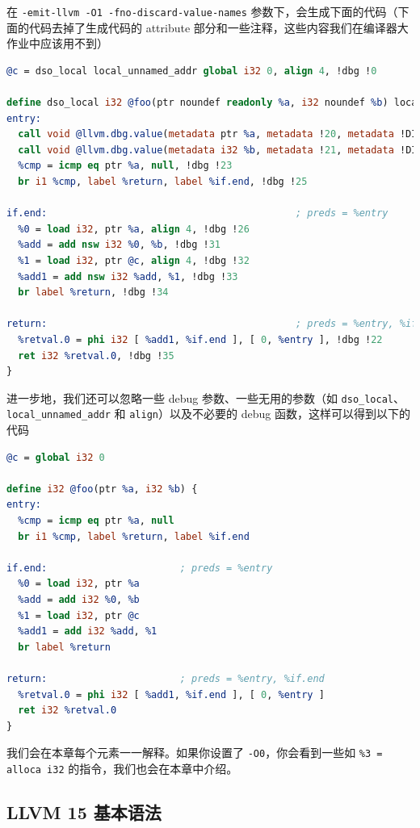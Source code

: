 在 \texttt{-emit-llvm -O1 -fno-discard-value-names}
参数下，会生成下面的代码（下面的代码去掉了生成代码的 attribute
部分和一些注释，这些内容我们在编译器大作业中应该用不到）

\begin{lstlisting}[language=llvm]
@c = dso_local local_unnamed_addr global i32 0, align 4, !dbg !0

define dso_local i32 @foo(ptr noundef readonly %a, i32 noundef %b) local_unnamed_addr #0 !dbg !15 {
entry:
  call void @llvm.dbg.value(metadata ptr %a, metadata !20, metadata !DIExpression()), !dbg !22
  call void @llvm.dbg.value(metadata i32 %b, metadata !21, metadata !DIExpression()), !dbg !22
  %cmp = icmp eq ptr %a, null, !dbg !23
  br i1 %cmp, label %return, label %if.end, !dbg !25

if.end:                                           ; preds = %entry
  %0 = load i32, ptr %a, align 4, !dbg !26
  %add = add nsw i32 %0, %b, !dbg !31
  %1 = load i32, ptr @c, align 4, !dbg !32
  %add1 = add nsw i32 %add, %1, !dbg !33
  br label %return, !dbg !34

return:                                           ; preds = %entry, %if.end
  %retval.0 = phi i32 [ %add1, %if.end ], [ 0, %entry ], !dbg !22
  ret i32 %retval.0, !dbg !35
}
\end{lstlisting}

进一步地，我们还可以忽略一些 debug 参数、一些无用的参数（如
\texttt{dso\_local}、\texttt{local\_unnamed\_addr} 和
\texttt{align}）以及不必要的 debug 函数，这样可以得到以下的代码

\begin{lstlisting}[language=llvm]
@c = global i32 0

define i32 @foo(ptr %a, i32 %b) {
entry:
  %cmp = icmp eq ptr %a, null
  br i1 %cmp, label %return, label %if.end

if.end:                       ; preds = %entry
  %0 = load i32, ptr %a
  %add = add i32 %0, %b
  %1 = load i32, ptr @c
  %add1 = add i32 %add, %1
  br label %return

return:                       ; preds = %entry, %if.end
  %retval.0 = phi i32 [ %add1, %if.end ], [ 0, %entry ]
  ret i32 %retval.0
}
\end{lstlisting}

我们会在本章每个元素一一解释。如果你设置了 \texttt{-O0}，你会看到一些如
\texttt{\%3 = alloca i32} 的指令，我们也会在本章中介绍。

\subsection{LLVM 15 基本语法}


